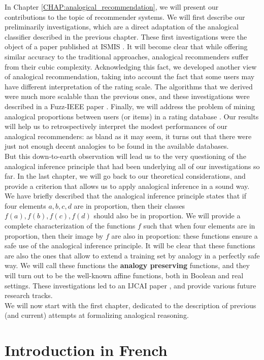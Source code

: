 In Chapter \ref{CHAP:analogical_recommendation}, we will present our
contributions to the topic of recommender systems. We will first describe our
preliminarily investigations, which are a direct adaptation of the analogical
classifier described in the previous chapter. These first investigations were
the object of a paper published at ISMIS \cite{HugPraRicISMIS15}. It will
become clear that while offering similar accuracy to the traditional
approaches, analogical recommenders suffer from their cubic complexity.
Acknowledging this fact, we developed another view of analogical
recommendation, taking into account the fact that some users may have different
interpretation of the rating scale. The algorithms that we derived were much
more scalable than the previous ones, and these investigations were described
in a Fuzz-IEEE paper \cite{HugPraRicSerFuzzIEEE16}.  Finally, we will address
the problem of mining analogical proportions between users (or items) in a
rating database \cite{HugPraRicSerLFA16}. Our results will help us to
retrospectively interpret the modest performances of our analogical
recommenders: as bland as it may seem, it turns out that there were just not
enough decent analogies to be found in the available databases.\\

But this down-to-earth observation will lead us to the very questioning of
the analogical inference principle that had been underlying all of our
investigations so far. In the last chapter, we will go back to our theoretical
considerations, and provide a criterion that allows us to apply analogical
inference in a sound way. We have briefly described that the analogical
inference principle states that if four elements $a, b, c, d$ are in
proportion, then their classes $f(a), f(b), f(c), f(d)$ should also be in
proportion. We will provide a complete characterization of the functions $f$
such that when four elements are in proportion, then their image by $f$ are
also in proportion: these functions ensure a safe use of the analogical
inference principle. It will be clear that these functions are also the ones
that allow to extend a training set by analogy in a perfectly safe way. We will
call these functions the \textbf{analogy preserving} functions, and they will
turn out to be the well-known affine functions, both in Boolean and real
settings. These investigations led to an IJCAI paper
\cite{CouHugPraRicIJCAI17}, and provide various future research tracks.\\


We will now start with the first chapter, dedicated to the description of
previous (and current) attempts at formalizing analogical reasoning.

\newpage

\section*{Introduction in French}


